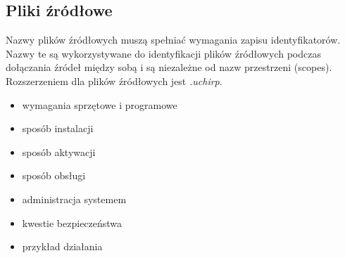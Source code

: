 \subsection{Pliki źródłowe}
Nazwy plików źródłowych muszą spełniać wymagania zapisu identyfikatorów. Nazwy te są wykorzystywane do identyfikacji plików źródłowych podczas dołączania źródeł między sobą i są niezależne od nazw przestrzeni (scopes). Rozszerzeniem dla plików źródłowych jest \textit{.uchirp}.

\begin{itemize}
\item  wymagania sprzętowe i programowe
\item  sposób instalacji
\item  sposób aktywacji
\item  sposób obsługi
\item  administracja systemem
\item  kwestie bezpieczeństwa
\item  przykład działania
\end{itemize}

%
%
%
%
%        


